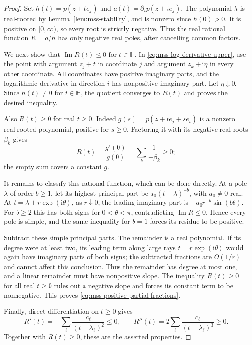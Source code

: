 \begin{proof}
Set $h(t)=p(z+te_j)$ and $a(t)=\partial_i p(z+te_j)$.
The polynomial $h$ is real-rooted by
Lemma~\ref{lem:mss-stability}, and is nonzero since $h(0)>0$.
It is positive on $[0,\infty)$, so every root is strictly negative.
Thus the real rational function $R=a/h$ has only negative real
poles, after cancelling common factors.

We next show that $\operatorname{Im}R(t)\leq0$ for $t\in\mathbb H$.
In \eqref{eq:mss-log-derivative-upper}, use the point with argument
$z_j+t$ in coordinate $j$ and argument $z_k+\mathrm i\eta$ in every
other coordinate.  All coordinates have positive imaginary parts,
and the logarithmic derivative in direction $i$ has nonpositive
imaginary part.  Let $\eta\downarrow0$.
Since $h(t)\ne0$ for $t\in\mathbb H$, the quotient converges to
$R(t)$ and proves the desired inequality.

Also $R(t)\geq0$ for real $t\geq0$.  Indeed
$g(s)=p(z+te_j+se_i)$ is a nonzero real-rooted polynomial, positive
for $s\geq0$.  Factoring it with its negative real roots $\beta_k$
gives
\[
 R(t)=\frac{g'(0)}{g(0)}=\sum_k\frac1{-\beta_k}\geq0;
\]
the empty sum covers a constant $g$.

It remains to classify this rational function, which can be done
directly.  At a pole $\lambda$ of order $b\geq1$, let its highest
principal part be $a_0(t-\lambda)^{-b}$, with $a_0\ne0$ real.
At $t=\lambda+r\exp(\mathrm i\theta)$, as $r\downarrow0$, the
leading imaginary part is
$-a_0r^{-b}\sin(b\theta)$.
For $b\geq2$ this has both signs for $0<\theta<\pi$, contradicting
$\operatorname{Im}R\leq0$.  Hence every pole is simple, and the same
inequality for $b=1$ forces its residue to be positive.

Subtract these simple principal parts.  The remainder is a real
polynomial.  If its degree were at least two, its leading term along
large rays $t=r\exp(\mathrm i\theta)$ would again have imaginary
parts of both signs; the subtracted fractions are $O(1/r)$ and
cannot affect this conclusion.  Thus the remainder has degree at
most one, and a linear remainder must have nonpositive slope.
The inequality $R(t)\geq0$ for all real $t\geq0$ rules out a
negative slope and forces its constant term to be nonnegative.
This proves \eqref{eq:mss-positive-partial-fractions}.

Finally, direct differentiation on $t\geq0$ gives
\[
 R'(t)=-\sum_\ell\frac{c_\ell}{(t-\lambda_\ell)^2}\leq0,
 \qquad
 R''(t)=2\sum_\ell\frac{c_\ell}{(t-\lambda_\ell)^3}\geq0.
\]
Together with $R(t)\geq0$, these are the asserted properties.
\end{proof}

